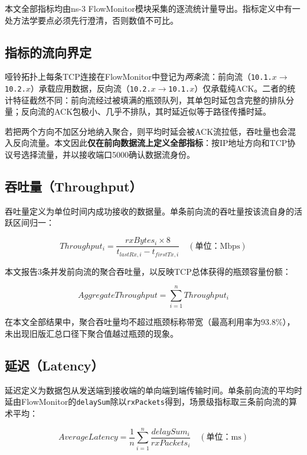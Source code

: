 本文全部指标均由ns-3 FlowMonitor模块采集的逐流统计量导出。指标定义中有一处方法学要点必须先行澄清，否则数值不可比。

\subsection{指标的流向界定}
\label{subsec:direction}

哑铃拓扑上每条TCP连接在FlowMonitor中登记为\emph{两条}流：前向流（\texttt{10.1.$x$}$\rightarrow$\texttt{10.2.$x$}）承载应用数据，反向流（\texttt{10.2.$x$}$\rightarrow$\texttt{10.1.$x$}）仅承载纯ACK。二者的统计特征截然不同：前向流经过被填满的瓶颈队列，其单包时延包含完整的排队分量；反向流的ACK包极小、几乎不排队，其时延近似等于路径传播时延。

若把两个方向不加区分地纳入聚合，则平均时延会被ACK流拉低，吞吐量也会混入反向流量。本文因此\textbf{仅在前向数据流上定义全部指标}：按IP地址方向和TCP协议号选择流量，并以接收端口5000确认数据流身份。

\subsection{吞吐量（Throughput）}

吞吐量定义为单位时间内成功接收的数据量。单条前向流的吞吐量按该流自身的活跃区间归一：

\begin{equation}
Throughput_i = \frac{rxBytes_i \times 8}{t_{lastRx,i} - t_{firstTx,i}} \quad (\text{单位：Mbps})
\end{equation}

本文报告3条并发前向流的聚合吞吐量，以反映TCP总体获得的瓶颈容量份额：

\begin{equation}
AggregateThroughput = \sum_{i=1}^{n} Throughput_i
\end{equation}

在本文全部结果中，聚合吞吐量均不超过瓶颈标称带宽（最高利用率为93.8\%），未出现旧版汇总口径下聚合值越过瓶颈的现象。

\subsection{延迟（Latency）}

延迟定义为数据包从发送端到接收端的单向端到端传输时间。单条前向流的平均时延由FlowMonitor的\texttt{delaySum}除以\texttt{rxPackets}得到，场景级指标取三条前向流的算术平均：

\begin{equation}
AverageLatency = \frac{1}{n}\sum_{i=1}^{n} \frac{delaySum_i}{rxPackets_i} \quad (\text{单位：ms})
\end{equation}

